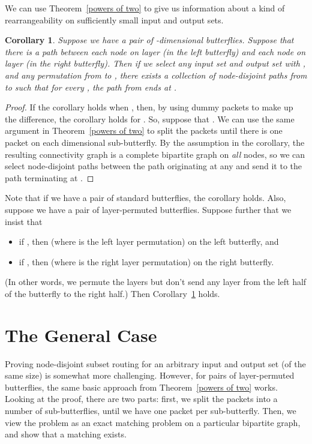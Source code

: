 \documentclass[12pt]{article}
\newtheorem{corollary}{Corollary}
\begin{document}
We can use Theorem~\ref{powers of two} to give us information about
a kind of rearrangeability on sufficiently small input and output sets.
\begin{corollary} \label{mini-rearrangeability}
Suppose we have a pair of -dimensional butterflies.
Suppose that there is a path between each node on layer 
 (in the left butterfly) and each node
on layer  (in the right butterfly).
Then if we select any input set  and output set  with
,  and any permutation  from
 to , there exists a collection of node-disjoint paths
from  to  such that for every , the path from 
ends at .
\end{corollary}
\begin{proof}
If the corollary holds when , then,
by using dummy packets to make up the difference, the corollary 
holds for .  So, suppose that 
.  We can use the same argument in
Theorem~\ref{powers of two} to split the packets until there is one
packet on each  dimensional sub-butterfly.
By the assumption in the corollary, the resulting connectivity graph
is a complete bipartite graph on \emph{all} nodes, so we can select
node-disjoint paths between the path originating at any  and
send it to the path terminating at .\end{proof}

Note that if we have a pair of standard butterflies, the corollary holds.
Also, suppose we have a pair of layer-permuted butterflies.
Suppose further that we insist that
\begin{itemize}
\item  if , then 
 (where  is the left layer permutation)
 on the left butterfly, and
\item
 if , then 
 (where  is the right layer 
permutation) on the right butterfly.
\end{itemize}
(In other words, we permute the layers but don't send any layer from the
left half of the butterfly to the right half.)
Then Corollary~\ref{mini-rearrangeability} holds.

\section{The General Case}

Proving node-disjoint 
subset routing for an arbitrary input and output set (of the same 
size) is somewhat more challenging.  However, 
for pairs of layer-permuted butterflies,
the same basic approach
from Theorem~\ref{powers of two} works.  Looking at the proof, there are
two parts: first, we split the packets into a number of sub-butterflies,
until we have one packet per sub-butterfly.  Then, we view the 
problem as an
exact matching problem on a particular bipartite graph, and show that
a matching exists.  
\end{document}
